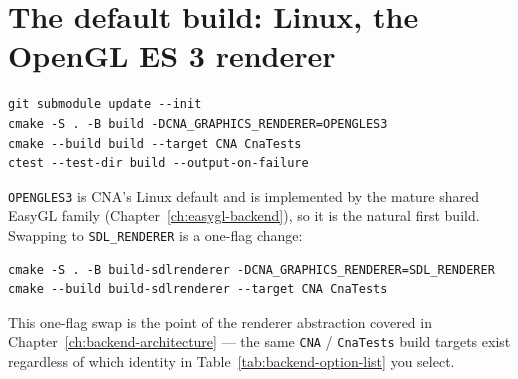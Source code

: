 \section{The default build: Linux, the OpenGL ES 3 renderer}

\begin{lstlisting}[style=cnashell]
git submodule update --init
cmake -S . -B build -DCNA_GRAPHICS_RENDERER=OPENGLES3
cmake --build build --target CNA CnaTests
ctest --test-dir build --output-on-failure
\end{lstlisting}

\texttt{OPENGLES3} is CNA's Linux default and is implemented by the mature shared EasyGL
family (Chapter~\ref{ch:easygl-backend}), so it is the natural first build. Swapping to
\texttt{SDL\_RENDERER} is a
one-flag change:

\begin{lstlisting}[style=cnashell]
cmake -S . -B build-sdlrenderer -DCNA_GRAPHICS_RENDERER=SDL_RENDERER
cmake --build build-sdlrenderer --target CNA CnaTests
\end{lstlisting}

This one-flag swap is the point of the renderer abstraction covered in
Chapter~\ref{ch:backend-architecture} --- the same \texttt{CNA} / \texttt{CnaTests} build
targets exist regardless of which identity in Table~\ref{tab:backend-option-list} you select.

